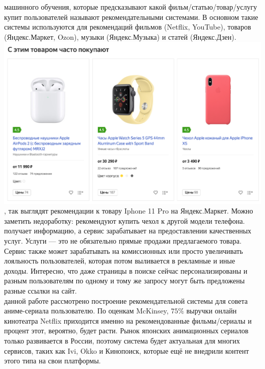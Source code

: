\documentclass{article}
\newcommand\tab[1][1cm]{\hspace*{#1}}
\begin{document}
 машинного обучения, которые предсказывают какой фильм/статью/товар/услугу купит пользователей называют рекомендательными системами. В основном такие системы используются для рекомендаций фильмов (Netflix, YouTube), товаров (Яндекс.Маркет, Ozon), музыки (Яндекс.Музыка) и статей (Яндекс.Дзен). \\
\tab\includegraphics[scale=0.30]{f1.png}\\
, так выглядят рекомендации к товару Iphone 11 Pro на Яндекс.Маркет. Можно заметить недоработку: рекомендуют купить чехол к другой модели телефона.\\
 получает информацию, а сервис зарабатывает на предоставлении качественных услуг. Услуги — это не обязательно прямые продажи предлагаемого товара. Сервис также может зарабатывать на комиссионных или просто увеличивать лояльность пользователей, которая потом выливается в рекламные и иные доходы. Интересно, что даже страницы в поиске сейчас персонализированы и разным пользователям по одному и тому же запросу могут быть предложены разные ссылки на сайт.\\
 данной работе рассмотрено построение рекомендательной системы для совета аниме-сериала пользователю. По оценкам McKinsey, $75\%$ выручки онлайн кинотеатра Netflix приходится именно на рекомендованные фильмы/сериалы и процент этот, вероятно, будет расти. Рынок японских анимационных сериалов только развивается в России, поэтому система будет актуальная для многих сервисов, таких как Ivi, Okko и Кинопоиск, которые ещё не внедрили контент этого типа на свои платформы.\\
\qquad 

\newpage
\end{document}
